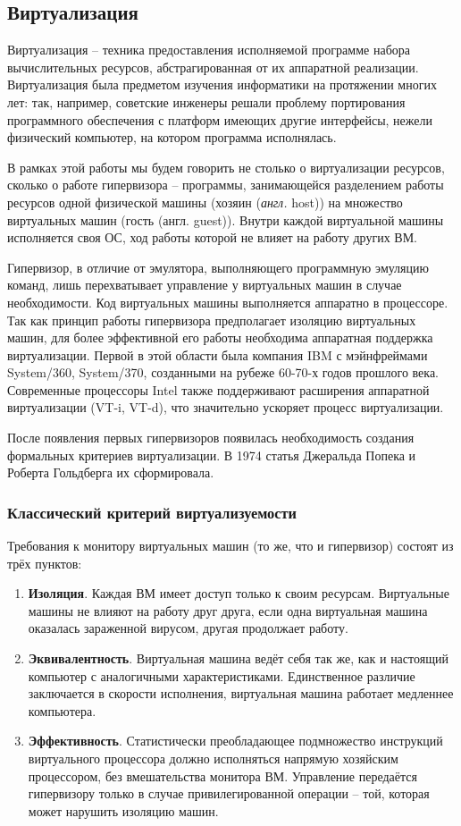 \documentclass[a4paper,11pt]{extarticle}
\begin{document}
	\subsection{Виртуализация}
	Виртуализация – техника предоставления исполняемой программе набора вычислительных ресурсов, абстрагированная от их аппаратной реализации. Виртуализация была предметом изучения информатики на протяжении многих лет: так, например, советские инженеры решали проблему портирования программного обеспечения с платформ имеющих другие интерфейсы, нежели физический компьютер, на котором программа исполнялась.\par
	В рамках этой работы мы будем говорить не столько о виртуализации ресурсов, сколько о работе гипервизора – программы, занимающейся разделением работы ресурсов одной физической машины (хозяин (\textit{англ.} host)) на множество виртуальных машин (гость (англ. guest)). Внутри каждой виртуальной машины исполняется своя ОС, ход работы которой не влияет на работу других ВМ.\par
	Гипервизор, в отличие от эмулятора, выполняющего программную эмуляцию команд, лишь перехватывает управление у виртуальных машин в случае необходимости. Код виртуальных машины выполняется аппаратно в процессоре. Так как принцип работы гипервизора предполагает изоляцию виртуальных машин, для более эффективной его работы необходима аппаратная поддержка виртуализации. Первой в этой области была компания IBM с мэйнфреймами System/360, System/370, созданными на рубеже 60-70-х годов прошлого века. Современные процессоры Intel также поддерживают расширения аппаратной виртуализации (VT-i, VT-d), что значительно ускоряет процесс виртуализации.\par
	После появления первых гипервизоров появилась необходимость создания формальных критериев виртуализации. В 1974 статья Джеральда Попека и Роберта Гольдберга их сформировала.\par
	\subsubsection{Классический критерий виртуализуемости}
	Требования к монитору виртуальных машин (то же, что и гипервизор) состоят из трёх пунктов:
	\begin{enumerate}
		\item \textbf{Изоляция}. Каждая ВМ имеет доступ только к своим ресурсам. Виртуальные машины не влияют на работу друг друга, если одна виртуальная машина оказалась зараженной вирусом, другая продолжает работу.
		\item \textbf{Эквивалентность}. Виртуальная машина ведёт себя так же, как и настоящий компьютер с аналогичными характеристиками. Единственное различие заключается в скорости исполнения, виртуальная машина работает медленнее компьютера.
		\item \textbf{Эффективность}. Статистически преобладающее подмножество инструкций виртуального процессора должно исполняться напрямую хозяйским процессором, без вмешательства монитора ВМ. Управление передаётся гипервизору только в случае привилегированной операции – той, которая может нарушить изоляцию машин.
	\end{enumerate}
\end{document}
